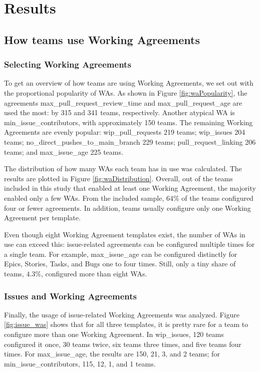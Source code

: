 \chapter{Results}

\section{How teams use Working Agreements}

\subsection{Selecting Working Agreements}

To get an overview of how teams are using Working Agreements, we set out with the proportional popularity of WAs. As shown in Figure \ref{fig:waPopularity}, the agreements max\_pull\_request\_review\_time and max\_pull\_request\_age are used the most: by 315 and 341 teams, respectively. Another atypical WA is min\_issue\_contributors, with approximately 150 teams. The remaining Working Agreements are evenly popular: wip\_pull\_requests 219 teams; wip\_issues 204 teams; no\_direct\_pushes\_to\_main\_branch 229 teams; pull\_request\_linking 206 teams; and max\_issue\_age 225 teams.



The distribution of how many WAs each team has in use was calculated. The results are plotted in Figure \ref{fig:waDistribution}. Overall, out of the teams included in this study that enabled at least one Working Agreement, the majority enabled only a few WAs. From the included sample, $64\%$ of the teams configured four or fewer agreements. In addition, teams usually configure only one Working Agreement per template.



Even though eight Working Agreement templates exist, the number of WAs in use can exceed this: issue-related agreements can be configured multiple times for a single team. For example, max\_issue\_age can be configured distinctly for Epics, Stories, Tasks, and Bugs one to four times. Still, only a tiny share of teams, $4.3\%$, configured more than eight WAs.

\subsection{Issues and Working Agreements}

Finally, the usage of issue-related Working Agreements was analyzed. Figure \ref{fig:issue_was} shows that for all three templates, it is pretty rare for a team to configure more than one Working Agreement. In wip\_issues, 120 teams configured it once, 30 teams twice, six teams three times, and five teams four times. For max\_issue\_age, the results are 150, 21, 3, and 2 teams; for min\_issue\_contributors, 115, 12, 1, and 1 teams.   

